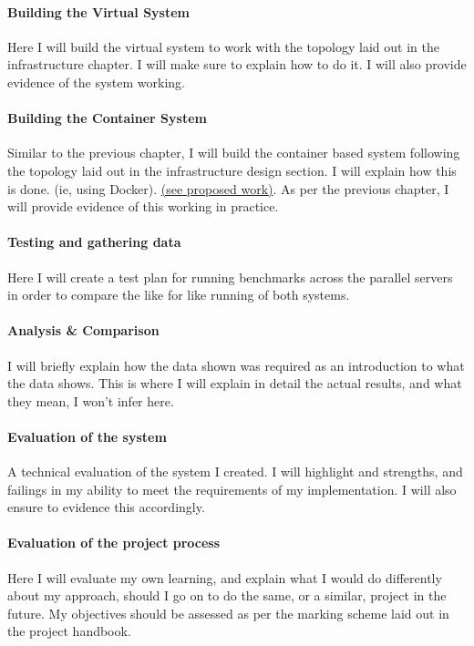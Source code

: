 \paragraph{Building the Virtual System} Here I will build the virtual system to work with the topology laid out in the infrastructure chapter. I will make sure to explain how to do it. I will also provide evidence of the system working.

\paragraph{Building the Container System} Similar to the previous chapter, I will build the container based system following the topology laid out in the infrastructure design section. I will explain how this is done. (ie, using Docker). \hyperref[proposed]{(see proposed work)}. As per the previous chapter, I will provide evidence of this working in practice.

\paragraph{Testing and gathering data} Here I will create a test plan for running benchmarks across the parallel servers in order to compare the like for like running of both systems.

\paragraph{Analysis \& Comparison} I will briefly explain how the data shown was required as an introduction to what the data shows. This is where I will explain in detail the actual results, and what they mean, I won't infer here.

\paragraph{Evaluation of the system} A technical evaluation of the system I created. I will highlight and strengths, and failings in my ability to meet the requirements of my implementation. I will also ensure to evidence this accordingly.

\paragraph{Evaluation of the project process} Here I will evaluate my own learning, and explain what I would do differently about my approach, should I go on to do the same, or a similar, project in the future. My objectives should be assessed as per the marking scheme laid out in the project handbook.

